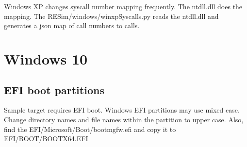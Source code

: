 \documentclass[titlepage]{article}
\begin{document}
\begin{appendices}
Windows XP changes syscall number mapping frequently.  The ntdll.dll does the mapping.  The 
RESim/windows/winxpSyscalls.py reads the ntdll.dll and generates a json map of call numbers to calls.

\section{Windows 10}
\subsection{EFI boot partitions}
Sample target requires EFI boot. Windows EFI partitions may use mixed case.  Change directory names and
file names within the partition to upper case.  Also, find the EFI/Microsoft/Boot/bootmgfw.efi and copy
it to EFI/BOOT/BOOTX64.EFI


\end{appendices}
\end{document}
